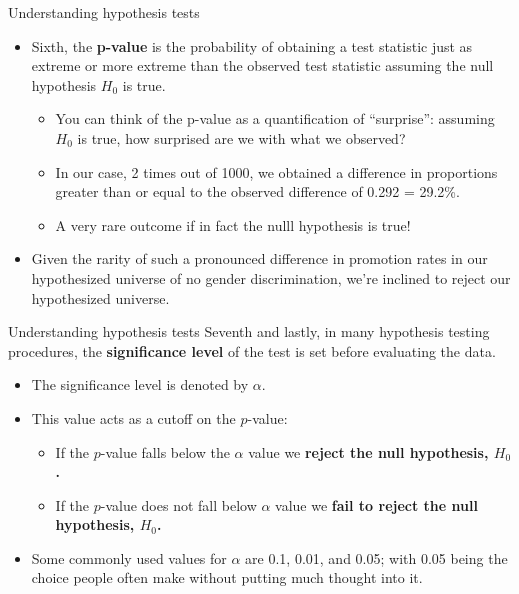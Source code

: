 \documentclass[
  ignorenonframetext,
]{beamer}
\providecommand{\tightlist}{%
  \setlength{\itemsep}{0pt}\setlength{\parskip}{0pt}}
\begin{document}
\begin{frame}{Understanding hypothesis tests}
\protect\hypertarget{understanding-hypothesis-tests-8}{}
\begin{itemize}
\item
  Sixth, the \textbf{p-value} is the probability of obtaining a test
  statistic just as extreme or more extreme than the observed test
  statistic assuming the null hypothesis \(H_0\) is true.

  \begin{itemize}
  \tightlist
  \item
    You can think of the p-value as a quantification of ``surprise'':
    assuming \(H_0\) is true, how surprised are we with what we
    observed?
  \item
    In our case, 2 times out of 1000, we obtained a difference in
    proportions greater than or equal to the observed difference of
    0.292 = 29.2\%.
  \item
    A very rare outcome if in fact the nulll hypothesis is true!
  \end{itemize}
\item
  Given the rarity of such a pronounced difference in promotion rates in
  our hypothesized universe of no gender discrimination, we're inclined
  to reject our hypothesized universe.
\end{itemize}
\end{frame}

\begin{frame}{Understanding hypothesis tests}
\protect\hypertarget{understanding-hypothesis-tests-9}{}
Seventh and lastly, in many hypothesis testing procedures, the
\textbf{significance level} of the test is set before evaluating the
data.

\begin{itemize}
\item
  The significance level is denoted by \(\alpha\).
\item
  This value acts as a cutoff on the \(p\)-value:

  \begin{itemize}
  \tightlist
  \item
    If the \(p\)-value falls below the \(\alpha\) value we
    \textbf{reject the null hypothesis, \(H_0\).}
  \item
    If the \(p\)-value does not fall below \(\alpha\) value we
    \textbf{fail to reject the null hypothesis, \(H_0\).}
  \end{itemize}
\item
  Some commonly used values for \(\alpha\) are 0.1, 0.01, and 0.05; with
  0.05 being the choice people often make without putting much thought
  into it.
\end{itemize}
\end{frame}
\end{document}
